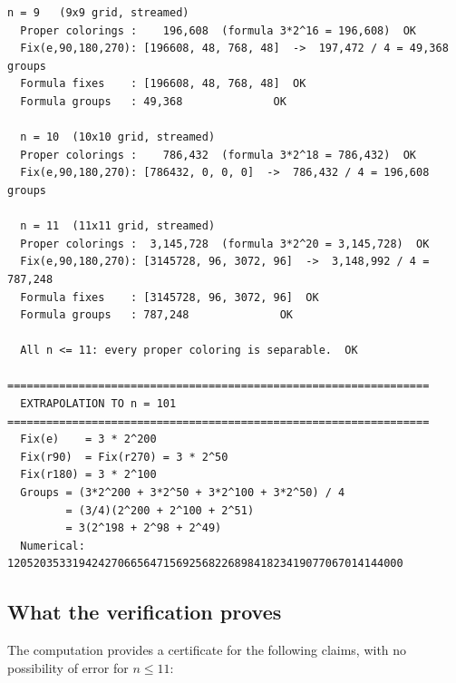 \documentclass{article}
\begin{document}
\begin{lstlisting}[language={},
  basicstyle=\scriptsize\ttfamily,
  backgroundcolor=\color{codebg},
  frame=single,
  numbers=none,
  caption={Complete verification output (n = 2--11).},
  label={lst:output}]
  n = 9   (9x9 grid, streamed)
  Proper colorings :    196,608  (formula 3*2^16 = 196,608)  OK
  Fix(e,90,180,270): [196608, 48, 768, 48]  ->  197,472 / 4 = 49,368 groups
  Formula fixes    : [196608, 48, 768, 48]  OK
  Formula groups   : 49,368              OK

  n = 10  (10x10 grid, streamed)
  Proper colorings :    786,432  (formula 3*2^18 = 786,432)  OK
  Fix(e,90,180,270): [786432, 0, 0, 0]  ->  786,432 / 4 = 196,608 groups

  n = 11  (11x11 grid, streamed)
  Proper colorings :  3,145,728  (formula 3*2^20 = 3,145,728)  OK
  Fix(e,90,180,270): [3145728, 96, 3072, 96]  ->  3,148,992 / 4 = 787,248
  Formula fixes    : [3145728, 96, 3072, 96]  OK
  Formula groups   : 787,248              OK

  All n <= 11: every proper coloring is separable.  OK

=================================================================
  EXTRAPOLATION TO n = 101
=================================================================
  Fix(e)    = 3 * 2^200
  Fix(r90)  = Fix(r270) = 3 * 2^50
  Fix(r180) = 3 * 2^100
  Groups = (3*2^200 + 3*2^50 + 3*2^100 + 3*2^50) / 4
         = (3/4)(2^200 + 2^100 + 2^51)
         = 3(2^198 + 2^98 + 2^49)
  Numerical: 1205203533194242706656471569256822689841823419077067014144000
\end{lstlisting}

\subsection{What the verification proves}

The computation provides a certificate for the following
claims, with no possibility of error for $n\leq 11$:
\end{document}
